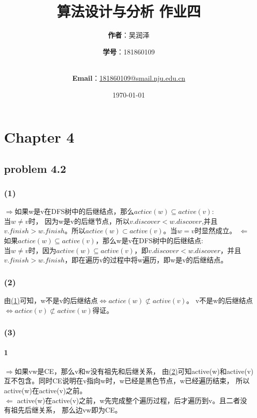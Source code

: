 \documentclass[11pt,a4paper,oneside,oldfontcommands]{ctexart}
\title{\Huge\textbf{算法设计与分析 作业四}\\}
\author{\Large\textbf{作者}：吴润泽 \and{\Large\textbf{学号}：181860109}\\
	\\
	\and {\Large\textbf{Email}：\href{mailto:181860109@smail.nju.edu.cn}{181860109@smail.nju.edu.cn}}\\}
\date{\Large\today}
\begin{document}
\maketitle
\newpage
\tableofcontents
\cleardoublepage
\section*{Chapter 4}
{\subsection*{problem 4.2}}
\hypertarget{(1)}{\subsubsection*{(1)}}
\textbf{$\Rightarrow$}如果w是v在DFS树中的后继结点，那么$actice(w)\subseteq active(v)$:\\
当$w\ne v$时，
因为w是v的后继节点，所以$v.discover<w.discover$,并且$v.finish>w.finish$。所以$actice(w)\subset active(v)$。当$w=v$时显然成立。
\textbf{$\Leftarrow$}如果$actice(w)\subseteq active(v)$，那么w是v在DFS树中的后继结点:\\
当$w\ne v$时，因为$active(w)\subseteq active(v)$，即$v.discover<w.discover$，并且$v.finish>w.finish$，即在遍历v的过程中将w遍历，即w是v的后继结点。
\hypertarget{(2)}{\subsubsection*{(2)}}
由\hyperref[(1)]{(1)}可知，w不是v的后继结点$\Leftrightarrow actice(w)\not\subset active(v)$。
v不是w的后继结点$\Leftrightarrow actice(v)\not\subset active(w)$得证。
\subsubsection*{(3)}
\paragraph*{\textcircled{1}}
\textbf{$\Rightarrow$}如果vw是CE，那么v和w没有祖先和后继关系，
由\hyperref[(2)]{(2)}可知active(w)和active(v)互不包含。同时CE说明在v指向w时，w已经是黑色节点，w已经遍历结束，
所以active(w)在active(v)之前。\\
\hspace*{20pt}\textbf{$\Leftarrow$ }active(w)在active(v)之前，w先完成整个遍历过程，后才遍历到v。且二者没有祖先后继关系，
那么边vw即为CE。\\
\end{document}
